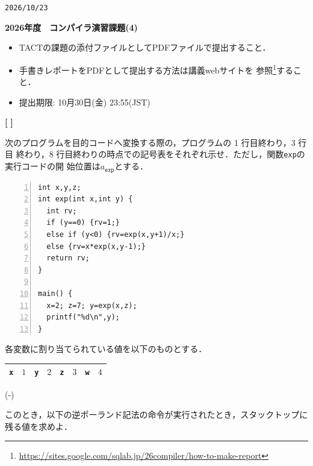 \documentclass[dvipdfmx]{jarticle}
\newcounter{coffee}
\newcounter{bean}
\begin{document}
\begin{flushright}
\verb|2026/10/23|
\end{flushright}
\begin{center}{\bf\Large
  2026年度　コンパイラ演習課題(4)
}\end{center}
\begin{itemize}
  \item TACTの課題の添付ファイルとしてPDFファイルで提出すること．
  \item 手書きレポートをPDFとして提出する方法は講義webサイトを
  参照\footnote{\url{https://sites.google.com/sqlab.jp/26compiler/how-to-make-report}}すること．
  \item 提出期限: 10月30日(金) 23:55(JST)
\end{itemize}

\begin{list}{{\bf [\,\,]}}{}
  \item 次のプログラムを目的コードへ変換する際の，プログラムの 1 行目終わり，3 行目
  終わり，8 行目終わりの時点での記号表をそれぞれ示せ．ただし，関数\texttt{exp}の実行コードの開
  始位置は$a_{\texttt{exp}}$とする．

  \begin{Verbatim}[numbers=left]
int x,y,z;
int exp(int x,int y) {
  int rv;
  if (y==0) {rv=1;}
  else if (y<0) {rv=exp(x,y+1)/x;}
  else {rv=x*exp(x,y-1);}
  return rv;
}

main() {
  x=2; z=7; y=exp(x,z);
  printf("%d\n",y);
}
  \end{Verbatim}
\item 各変数に割り当てられている値を以下のものとする．
\begin{center}
	\begin{tabularx}{.75\linewidth}{|X|X||X|X||X|X||X|X|}\hline
		\texttt{x} & $1$ & \texttt{y} & $2$ & \texttt{z} & $3$ & \texttt{w} & $4$\\\hline
	\end{tabularx}
\end{center}
\begin{list}{(-)}{}
  \item
このとき，以下の逆ポーランド記法の命令が実行されたとき，スタックトップに残る値を求めよ．


\end{list}
\end{list}
\end{document}
